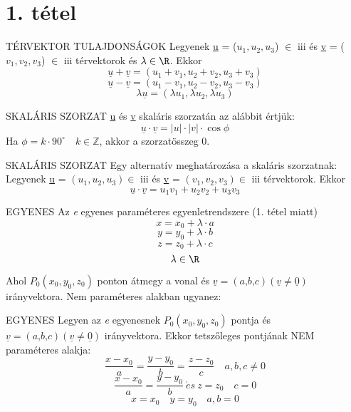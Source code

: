 \section{1. tétel}

\begin{tetel}{TÉRVEKTOR TULAJDONSÁGOK}
Legyenek \underline{u} = ($u_1, u_2, u_3$) $\in$ \Rn{3} és \underline{v} = ($v_1, v_2, v_3$) $\in$ \Rn{3} térvektorok és $\lambda \in \R$. Ekkor\\
$$\underline{u} + \underline{v} = (u_1 + v_1, u_2 + v_2, u_3 + v_3)$$
$$\underline{u} - \underline{v} = (u_1 - v_1, u_2 - v_2, u_3 - v_3)$$
$$\lambda \underline{u} = (\lambda u_1,\lambda u_2, \lambda u_3)$$
\end{tetel}

\begin{definicio}{SKALÁRIS SZORZAT}
\underline{u} és \underline{v} skaláris szorzatán az alábbit értjük:
$$\underline{u}\cdot\underline{v} = |u|\cdot|v|\cdot\cos\phi$$
Ha $\phi = k\cdot90^{\circ}\quad k\in\mathbb{Z}$, akkor a szorzatösszeg 0.
\end{definicio}

\begin{tetel}{SKALÁRIS SZORZAT}
Egy alternatív meghatározása a skaláris szorzatnak: \\Legyenek \underline{u} = $(u_1, u_2, u_3)\in$ \Rn{3} és \underline{v} = $(v_1, v_2, v_3)\in$ \Rn{3} térvektorok. Ekkor $$\underline{u}\cdot\underline{v} = u_1 v_1 + u_2 v_2 + u_3 v_3$$
\end{tetel}

\begin{tetel}{EGYENES}
Az \textit{e} egyenes paraméteres egyenletrendszere (1. tétel miatt)
$$x = x_0 + \lambda \cdot a$$
$$y = y_0 + \lambda \cdot b$$
$$z = z_0 + \lambda \cdot c$$
$$\lambda \in \R$$
\end{tetel}

Ahol $P_0 (x_0,y_0,z_0)$ ponton átmegy a vonal és $\underline{v} = (\textit{a,b,c})  (\underline{v} \neq \underline{0})$ irányvektora.
Nem paraméteres alakban ugyanez:

\begin{tetel}{EGYENES}
Legyen az \textit{e} egyenesnek $P_0 (x_0,y_0,z_0)$ pontja és $\underline{v} = (\textit{a,b,c})  (\underline{v} \neq \underline{0})$ irányvektora. Ekkor tetszőleges pontjának NEM paraméteres alakja:
$$\frac{x-x_0}{a} = \frac{y-y_0}{b} = \frac{z-z_0}{c}\quad a, b, c \neq 0$$
$$\frac{x-x_0}{a} = \frac{y-y_0}{b} \:\acute{e}s\: z = z_0 \quad c = 0$$
$$x = x_0\quad y = y_0\quad a,b = 0$$
\end{tetel}

